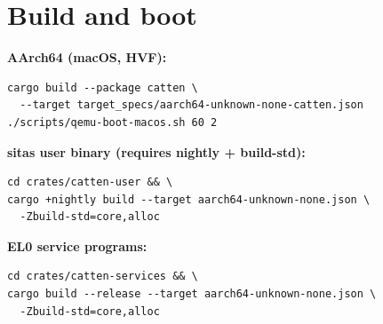 \section{Build and boot}

\textbf{AArch64 (macOS, HVF):}
\begin{verbatim}
cargo build --package catten \
  --target target_specs/aarch64-unknown-none-catten.json
./scripts/qemu-boot-macos.sh 60 2
\end{verbatim}

\textbf{sitas user binary (requires nightly + build-std):}
\begin{verbatim}
cd crates/catten-user && \
cargo +nightly build --target aarch64-unknown-none.json \
  -Zbuild-std=core,alloc
\end{verbatim}

\textbf{EL0 service programs:}
\begin{verbatim}
cd crates/catten-services && \
cargo build --release --target aarch64-unknown-none.json \
  -Zbuild-std=core,alloc
\end{verbatim}

\endinput
